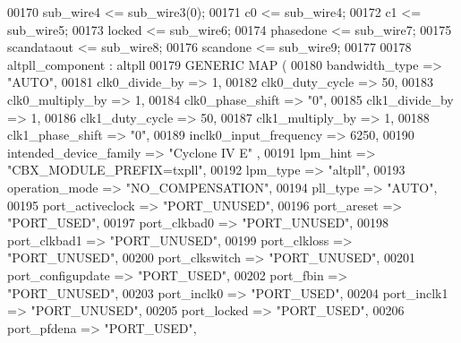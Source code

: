 \begin{DoxyCode}
{00170     \textcolor{vhdlchar}{sub_wire4}    \textcolor{vhdlchar}{<=} \textcolor{vhdlchar}{sub_wire3}\textcolor{vhdlchar}{(}\textcolor{vhdllogic}{}\textcolor{vhdllogic}{0}\textcolor{vhdlchar}{)};
00171     \textcolor{vhdlchar}{c0}    \textcolor{vhdlchar}{<=} \textcolor{vhdlchar}{sub_wire4};
00172     \textcolor{vhdlchar}{c1}    \textcolor{vhdlchar}{<=} \textcolor{vhdlchar}{sub_wire5};
00173     locked    <= sub\_wire6;
00174     \textcolor{vhdlchar}{phasedone}    \textcolor{vhdlchar}{<=} \textcolor{vhdlchar}{sub_wire7};
00175     \textcolor{vhdlchar}{scandataout}    \textcolor{vhdlchar}{<=} \textcolor{vhdlchar}{sub_wire8};
00176     \textcolor{vhdlchar}{scandone}    \textcolor{vhdlchar}{<=} \textcolor{vhdlchar}{sub_wire9};
00177 
00178     altpll_component : altpll
00179     \textcolor{keywordflow}{GENERIC} \textcolor{keywordflow}{MAP} (
00180         bandwidth\_type => \textcolor{keyword}{"AUTO"},
00181         clk0\_divide\_by => \textcolor{vhdllogic}{1},
00182         clk0\_duty\_cycle => \textcolor{vhdllogic}{50},
00183         clk0\_multiply\_by => \textcolor{vhdllogic}{1},
00184         clk0\_phase\_shift => "\textcolor{vhdllogic}{0}",
00185         clk1\_divide\_by => \textcolor{vhdllogic}{1},
00186         clk1\_duty\_cycle => \textcolor{vhdllogic}{50},
00187         clk1\_multiply\_by => \textcolor{vhdllogic}{1},
00188         clk1\_phase\_shift => "\textcolor{vhdllogic}{0}",
00189         inclk0\_input\_frequency => \textcolor{vhdllogic}{6250},
00190         intended\_device\_family => \textcolor{keyword}{"Cyclone IV E"}  ,
00191         lpm\_hint => \textcolor{keyword}{"CBX\_MODULE\_PREFIX=txpll"},
00192         lpm\_type => \textcolor{keyword}{"altpll"},
00193         operation\_mode => \textcolor{keyword}{"NO\_COMPENSATION"},
00194         pll\_type => \textcolor{keyword}{"AUTO"},
00195         port\_activeclock => \textcolor{keyword}{"PORT\_UNUSED"},
00196         port\_areset => \textcolor{keyword}{"PORT\_USED"},
00197         port\_clkbad0 => \textcolor{keyword}{"PORT\_UNUSED"},
00198         port\_clkbad1 => \textcolor{keyword}{"PORT\_UNUSED"},
00199         port\_clkloss => \textcolor{keyword}{"PORT\_UNUSED"},
00200         port\_clkswitch => \textcolor{keyword}{"PORT\_UNUSED"},
00201         port\_configupdate => \textcolor{keyword}{"PORT\_USED"},
00202         port\_fbin => \textcolor{keyword}{"PORT\_UNUSED"},
00203         port\_inclk0 => \textcolor{keyword}{"PORT\_USED"},
00204         port\_inclk1 => \textcolor{keyword}{"PORT\_UNUSED"},
00205         port\_locked => \textcolor{keyword}{"PORT\_USED"},
00206         port\_pfdena => \textcolor{keyword}{"PORT\_USED"},
}
\end{DoxyCode}
